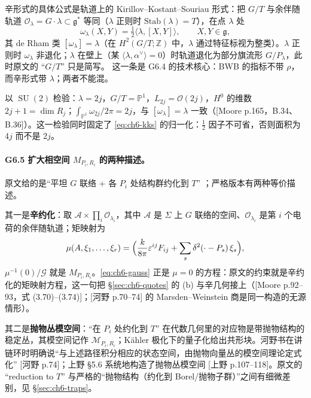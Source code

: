 辛形式的具体公式是轨道上的 Kirillov--Kostant--Souriau 形式：把 $G/T$ 与余伴随轨道 $\mathcal O_\lambda=G\cdot\lambda\subset\mathfrak g^*$ 等同（$\lambda$ 正则时 $\mathrm{Stab}(\lambda)=T$），在点 $\lambda$ 处
\begin{equation}
\omega_\lambda(X,Y)=\tfrac12\langle\lambda,[X,Y]\rangle,
\qquad X,Y\in\mathfrak g,
\label{eq:ch6-kks}
\end{equation}
其 de Rham 类 $[\omega_\lambda]=\lambda$（在 $H^2(G/T;\mathbb Z)$ 中，$\lambda$ 通过特征标视为整类）。$\lambda$ 正则时 $\omega_\lambda$ 非退化；$\lambda$ 在壁上（某 $\langle\lambda,\alpha^\vee\rangle=0$）时轨道退化为部分旗流形 $G/P_\lambda$，此时原文的 “$G/T$” 只是简写。\ours{} 这一条是 G6.4 的技术核心：BWB 的指标不带 $\rho$，而辛形式带 $\lambda$；两者不能混。

以 $\operatorname{SU}(2)$ 检验：$\lambda=2j$，$G/T=\mathbb P^1$，$L_{2j}=\mathcal O(2j)$，$H^0$ 的维数 $2j+1=\dim R_j$；$\int_{\mathbb P^1}\omega_{2j}/2\pi=2j$，与 $[\omega_\lambda]=\lambda$ 一致（[Moore p.165，B.34、B.36]）。这一检验同时固定了 \eqref{eq:ch6-kks} 的归一化：$\tfrac12$ 因子不可省，否则面积为 $4j$ 而不是 $2j$。

\paragraph{G6.5 扩大相空间 $M_{P_i,R_i}$ 的两种描述。}原文给的是“平坦 $G$ 联络 + 各 $P_i$ 处结构群约化到 $T$” ；严格版本有两种等价描述。

其一是\textbf{辛约化}：取 $\mathcal A\times\prod_i\mathcal O_{\lambda_i}$，其中 $\mathcal A$ 是 $\Sigma$ 上 $G$ 联络的空间、$\mathcal O_{\lambda_i}$ 是第 $i$ 个电荷的余伴随轨道；矩映射为
\[
\mu(A,\xi_1,\dots,\xi_r)=\Bigl(\frac{k}{8\pi}\varepsilon^{ij}F_{ij}+\sum_s\delta^2(\cdot-P_s)\,\xi_s\Bigr),
\]
$\mu^{-1}(0)/\mathcal G$ 就是 $M_{P_i,R_i}$。\eqref{eq:ch6-gauss} 正是 $\mu=0$ 的方程：原文的约束就是辛约化的矩映射方程，这一句把 \S\ref{sec:ch6-quotes} 的 (b) 与辛几何接上（[Moore p.92--93，式 (3.70)--(3.74)]；[河野 p.70--74] 的 Marsden--Weinstein 商是同一构造的无源情形）。

其二是\textbf{抛物丛模空间}：“在 $P_i$ 处约化到 $T$” 在代数几何里的对应物是带抛物结构的稳定丛，其模空间记作 $\mathcal M_{P_i,R_i}$；Kähler 极化下的量子化给出共形块。河野书在讲链环时明确说“与上述路径积分相应的状态空间，由抛物向量丛的模空间理论定式化” [河野 p.74]；上野 \S5.6 系统地构造了抛物丛模空间 [上野 p.107--118]。原文的 “reduction to $T$” 与严格的“抛物结构（约化到 Borel/抛物子群）”之间有细微差别，见 \S\ref{sec:ch6-traps}。

